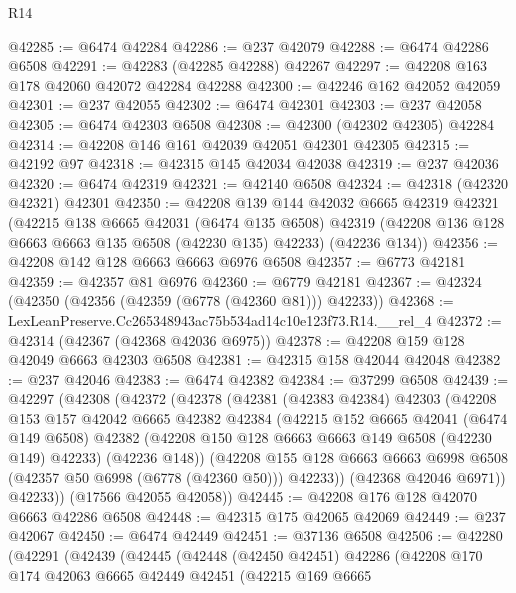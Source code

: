 \begin{lexlean}{R14}
\begin{coremodule}
@42285 := @6474 @42284
@42286 := @237 @42079
@42288 := @6474 @42286 @6508
@42291 := @42283 (@42285 @42288) @42267
@42297 := @42208 @163 @178 @42060 @42072 @42284 @42288
@42300 := @42246 @162 @42052 @42059
@42301 := @237 @42055
@42302 := @6474 @42301
@42303 := @237 @42058
@42305 := @6474 @42303 @6508
@42308 := @42300 (@42302 @42305) @42284
@42314 := @42208 @146 @161 @42039 @42051 @42301 @42305
@42315 := @42192 @97
@42318 := @42315 @145 @42034 @42038
@42319 := @237 @42036
@42320 := @6474 @42319
@42321 := @42140 @6508
@42324 := @42318 (@42320 @42321) @42301
@42350 := @42208
    @139
    @144
    @42032
    @6665
    @42319
    @42321
    (@42215
      @138
      @6665
      @42031
      (@6474 @135 @6508)
      @42319
      (@42208 @136 @128 @6663 @6663 @135 @6508 (@42230 @135) @42233)
      (@42236 @134))
@42356 := @42208 @142 @128 @6663 @6663 @6976 @6508
@42357 := @6773 @42181
@42359 := @42357 @81 @6976
@42360 := @6779 @42181
@42367 := @42324 (@42350 (@42356 (@42359 (@6778 (@42360 @81))) @42233))
@42368 := LexLeanPreserve.Cc265348943ac75b534ad14c10e123f73.R14.__rel_4
@42372 := @42314 (@42367 (@42368 @42036 @6975))
@42378 := @42208 @159 @128 @42049 @6663 @42303 @6508
@42381 := @42315 @158 @42044 @42048
@42382 := @237 @42046
@42383 := @6474 @42382
@42384 := @37299 @6508
@42439 := @42297
    (@42308
      (@42372
        (@42378
          (@42381
            (@42383 @42384)
            @42303
            (@42208
              @153
              @157
              @42042
              @6665
              @42382
              @42384
              (@42215
                @152
                @6665
                @42041
                (@6474 @149 @6508)
                @42382
                (@42208 @150 @128 @6663 @6663 @149 @6508 (@42230 @149) @42233)
                (@42236 @148))
              (@42208
                @155
                @128
                @6663
                @6663
                @6998
                @6508
                (@42357 @50 @6998 (@6778 (@42360 @50)))
                @42233))
            (@42368 @42046 @6971))
          @42233))
      (@17566 @42055 @42058))
@42445 := @42208 @176 @128 @42070 @6663 @42286 @6508
@42448 := @42315 @175 @42065 @42069
@42449 := @237 @42067
@42450 := @6474 @42449
@42451 := @37136 @6508
@42506 := @42280
    (@42291
      (@42439
        (@42445
          (@42448
            (@42450 @42451)
            @42286
            (@42208
              @170
              @174
              @42063
              @6665
              @42449
              @42451
              (@42215
                @169
                @6665

\end{coremodule}
\end{lexlean}
